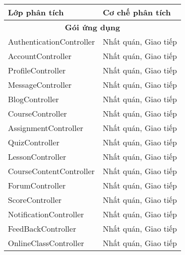 \documentclass[./../main_file.tex]{subfiles}
\begin{document}
	\begin{longtable}{|p{}|p{}|}
			\hline
			\textbf{Lớp phân tích}                & \textbf{Cơ chế phân tích}                                     \\ \hline
			\multicolumn{2}{|c|}{\textbf{Gói ứng dụng}}                                                           \\ \hline
			AuthenticationController              & Nhất quán, Giao tiếp                                          \\ \hline
			AccountController                     & Nhất quán, Giao tiếp                                          \\ \hline
			ProfileController                     & Nhất quán, Giao tiếp                                          \\ \hline
			MessageController                     & Nhất quán, Giao tiếp                                          \\ \hline
			BlogController                        & Nhất quán, Giao tiếp                                          \\ \hline
			CourseController                      & Nhất quán, Giao tiếp                                          \\ \hline
			AssignmentController                  & Nhất quán, Giao tiếp                                          \\ \hline
			QuizController                        & Nhất quán, Giao tiếp                                          \\ \hline
			LessonController                      & Nhất quán, Giao tiếp                                          \\ \hline
			CourseContentController               & Nhất quán, Giao tiếp                                          \\ \hline
			ForumController                       & Nhất quán, Giao tiếp                                          \\ \hline
			ScoreController                       & Nhất quán, Giao tiếp                                          \\ \hline
			NotificationController                & Nhất quán, Giao tiếp                                          \\ \hline
			FeedBackController                    & Nhất quán, Giao tiếp                                          \\ \hline
			OnlineClassController                 & Nhất quán, Giao tiếp                                          \\ \hline

\end{longtable}
\end{document}
